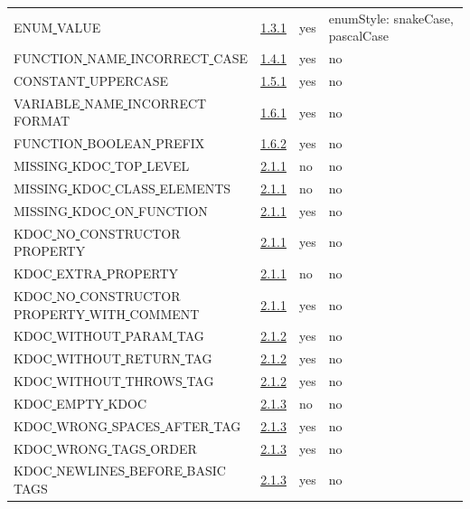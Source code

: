 \begin{longtable}{ |l|p{0.8cm}|p{0.8cm}| p{3cm} | }
ENUM\underline{ }VALUE & \hyperref[sec:1.3.1]{ 1.3.1} &  yes  &   enumStyle: snakeCase, pascalCase  \\
FUNCTION\underline{ }NAME\underline{ }INCORRECT\underline{ }CASE & \hyperref[sec:1.4.1]{ 1.4.1} &  yes  &   no  \\
CONSTANT\underline{ }UPPERCASE & \hyperref[sec:1.5.1]{ 1.5.1} &  yes  &   no  \\
VARIABLE\underline{ }NAME\underline{ }INCORRECT\underline{ }FORMAT & \hyperref[sec:1.6.1]{ 1.6.1} &  yes  &   no  \\
FUNCTION\underline{ }BOOLEAN\underline{ }PREFIX & \hyperref[sec:1.6.2]{ 1.6.2} &  yes  &   no  \\
MISSING\underline{ }KDOC\underline{ }TOP\underline{ }LEVEL & \hyperref[sec:2.1.1]{ 2.1.1} &  no  &   no  \\
MISSING\underline{ }KDOC\underline{ }CLASS\underline{ }ELEMENTS & \hyperref[sec:2.1.1]{ 2.1.1} &  no  &   no  \\
MISSING\underline{ }KDOC\underline{ }ON\underline{ }FUNCTION & \hyperref[sec:2.1.1]{ 2.1.1} &  yes  &   no  \\
KDOC\underline{ }NO\underline{ }CONSTRUCTOR\underline{ }PROPERTY & \hyperref[sec:2.1.1]{ 2.1.1} &  yes  &   no \\
KDOC\underline{ }EXTRA\underline{ }PROPERTY & \hyperref[sec:2.1.1]{ 2.1.1} &  no  &  no   \\
KDOC\underline{ }NO\underline{ }CONSTRUCTOR\underline{ }PROPERTY\underline{ }WITH\underline{ }COMMENT & \hyperref[sec:2.1.1]{ 2.1.1} &  yes  &   no \\
KDOC\underline{ }WITHOUT\underline{ }PARAM\underline{ }TAG & \hyperref[sec:2.1.2]{ 2.1.2} &  yes  &   no  \\
KDOC\underline{ }WITHOUT\underline{ }RETURN\underline{ }TAG & \hyperref[sec:2.1.2]{ 2.1.2} &  yes  &   no  \\
KDOC\underline{ }WITHOUT\underline{ }THROWS\underline{ }TAG & \hyperref[sec:2.1.2]{ 2.1.2} &  yes  &   no  \\
KDOC\underline{ }EMPTY\underline{ }KDOC & \hyperref[sec:2.1.3]{ 2.1.3} &  no  &   no  \\
KDOC\underline{ }WRONG\underline{ }SPACES\underline{ }AFTER\underline{ }TAG & \hyperref[sec:2.1.3]{ 2.1.3} &  yes  &   no  \\
KDOC\underline{ }WRONG\underline{ }TAGS\underline{ }ORDER & \hyperref[sec:2.1.3]{ 2.1.3} &  yes  &   no  \\
KDOC\underline{ }NEWLINES\underline{ }BEFORE\underline{ }BASIC\underline{ }TAGS & \hyperref[sec:2.1.3]{ 2.1.3} &  yes  &   no  \\

\end{longtable}
